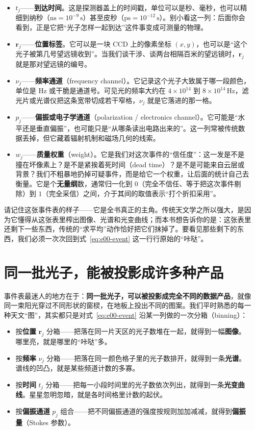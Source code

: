 \begin{itemize}
  \item \(t_j\)——\textbf{到达时间}。这是探测器盖上的时间戳，单位可以是秒、毫秒，也可以精细到纳秒（\(\mathrm{ns}=10^{-9}\,\mathrm{s}\)）甚至皮秒（\(\mathrm{ps}=10^{-12}\,\mathrm{s}\)）。别小看这一列：后面你会看到，正是它把“光子怎样一起到达”这件事变成可测量的物理。
  \item \(\bm r_j\)——\textbf{位置标签}。它可以是一块 CCD 上的像素坐标 \((x,y)\)，也可以是“这个光子被第几号望远镜收到”。当我们谈干涉、谈两台相隔百米的望远镜时，\(\bm r_j\) 就是那对望远镜的编号。
  \item \(\nu_j\)——\textbf{频率通道}（frequency channel）。它记录这个光子大致属于哪一段颜色，单位是 Hz 或干脆是通道号。可见光的频率大约在 \(4\times10^{14}\) 到 \(8\times10^{14}\,\mathrm{Hz}\)，滤光片或光谱仪把这条宽带切成若干窄格，\(\nu_j\) 就是它落进的那一格。
  \item \(p_j\)——\textbf{偏振或电子学通道}（polarization / electronics channel）。它可能是“水平还是垂直偏振”，也可能只是“从哪条读出电路出来的”。这一列常被传统数据丢掉，但它藏着辐射机制和磁场几何的线索。
  \item \(w_j\)——\textbf{质量权重}（weight）。它是我们对这次事件的“信任度”：这一发是不是撞在坏像素上？是不是紧挨着死时间（dead time）？是不是可能来自云层或背景？我们不粗暴地扔掉可疑事件，而是给它一个权重，让后面的统计自己去衡量。它是个\textbf{无量纲}数，通常归一化到 \(0\)（完全不信任、等于把这次事件剔除）到 \(1\)（完全采信）之间，介于其间的取值表示“打个折扣采用”。
\end{itemize}

请记住这张事件表的样子——它是全书真正的主角。传统天文学之所以强大，是因为它懂得从这张表里榨出图像、光谱和光变曲线；而本书想告诉你的是：这张表里还剩下一些东西，传统的“求平均”动作恰好把它们抹掉了。要看见那些剩下的东西，我们必须一次次回到式~\eqref{eq:e00-event} 这一行行原始的“咔哒”。

\section{同一批光子，能被投影成许多种产品}
\label{sec:e00-projection}

事件表最迷人的地方在于：\textbf{同一批光子，可以被投影成完全不同的数据产品}，就像同一束阳光穿过不同形状的窗棂，在地板上投出不同的图案。我们平时熟悉的每一种天文“图”，其实都只是对式~\eqref{eq:e00-event} 沿某一列做的一次分箱（binning）：

\begin{itemize}
  \item 按\textbf{位置} \(\bm r_j\) 分箱——把落在同一片天区的光子数堆在一起，就得到一幅\textbf{图像}。哪里亮，就是哪里的“咔哒”多。
  \item 按\textbf{频率} \(\nu_j\) 分箱——把落在同一颜色格子里的光子数排开，就得到一条\textbf{光谱}。谱线的凹凸，就是某些频道计数的多寡。
  \item 按\textbf{时间} \(t_j\) 分箱——把每一小段时间里的光子数依次列出，就得到一条\textbf{光变曲线}。星星忽明忽暗，就是各时间格里计数的起伏。
  \item 按\textbf{偏振通道} \(p_j\) 组合——把不同偏振通道的强度按规则加加减减，就得到\textbf{偏振量}（Stokes 参数）。
\end{itemize}

